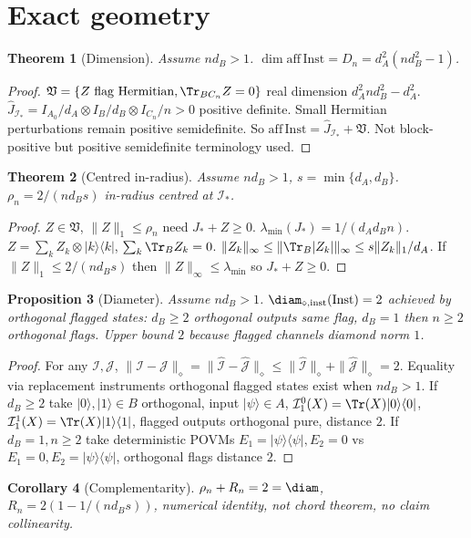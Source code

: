 \documentclass[11pt,a4paper]{article}
\newtheorem{theorem}{Theorem}[section]
\newtheorem{proposition}[theorem]{Proposition}
\newtheorem{corollary}[theorem]{Corollary}
\newcommand{\Inst}{\mathrm{Inst}}
\begin{document}
\section{Exact geometry}
\begin{theorem}[Dimension]
Assume $nd_B>1$. $\dim\mathrm{aff}\,\Inst=D_n=d_A^2(nd_B^2-1)$.
\end{theorem}
\begin{proof}
$\mathfrak V=\{Z\text{ flag Hermitian},\Tr_{BC_n}Z=0\}$ real dimension $d_A^2nd_B^2-d_A^2$.
$\widehat J_{\mathcal I_*}=I_{A_0}/d_A\otimes I_B/d_B\otimes I_{C_n}/n>0$ positive definite.
Small Hermitian perturbations remain positive semidefinite.
So $\mathrm{aff}\,\Inst=\widehat J_{\mathcal I_*}+\mathfrak V$.
Not block-positive but positive semidefinite terminology used.
\end{proof}
\begin{theorem}[Centred in-radius]
Assume $nd_B>1$, $s=\min\{d_A,d_B\}$. $\rho_n=2/(nd_Bs)$ in-radius centred at $\mathcal I_*$.
\end{theorem}
\begin{proof}
$Z\in\mathfrak V$, $\|Z\|_1\le\rho_n$ need $J_*+Z\ge0$.
$\lambda_{\min}(J_*)=1/(d_Ad_Bn)$.
$Z=\sum_kZ_k\otimes|k\rangle\langle k|$, $\sum_k\Tr_BZ_k=0$.
$\|Z_k\|_\infty\le\|\Tr_B|Z_k|\|_\infty\le s\|Z_k\|_1/d_A$.
If $\|Z\|_1\le2/(nd_Bs)$ then $\|Z\|_\infty\le\lambda_{\min}$ so $J_*+Z\ge0$.
\end{proof}
\begin{proposition}[Diameter]
Assume $nd_B>1$. $\diam_{\diamond,\mathrm{inst}}(\Inst)=2$ achieved by orthogonal flagged states: $d_B\ge2$ orthogonal outputs same flag, $d_B=1$ then $n\ge2$ orthogonal flags. Upper bound $2$ because flagged channels diamond norm $1$.
\end{proposition}
\begin{proof}
For any $\mathcal I,\mathcal J$, $\|\mathcal I-\mathcal J\|_{\diamond}=\|\widehat{\mathcal I}-\widehat{\mathcal J}\|_\diamond\le\|\widehat{\mathcal I}\|_\diamond+\|\widehat{\mathcal J}\|_\diamond=2$.
Equality via replacement instruments orthogonal flagged states exist when $nd_B>1$.
If $d_B\ge2$ take $|0\rangle,|1\rangle\in B$ orthogonal, input $|\psi\rangle\in A$, $\mathcal I^0_1(X)=\Tr(X)|0\rangle\langle0|$, $\mathcal I^1_1(X)=\Tr(X)|1\rangle\langle1|$, flagged outputs orthogonal pure, distance $2$.
If $d_B=1,n\ge2$ take deterministic POVMs $E_1=|\psi\rangle\langle\psi|,E_2=0$ vs $E_1=0,E_2=|\psi\rangle\langle\psi|$, orthogonal flags distance $2$.
\end{proof}
\begin{corollary}[Complementarity]
$\rho_n+R_n=2=\diam$, $R_n=2(1-1/(nd_Bs))$, numerical identity, not chord theorem, no claim collinearity.
\end{corollary}
\end{document}
